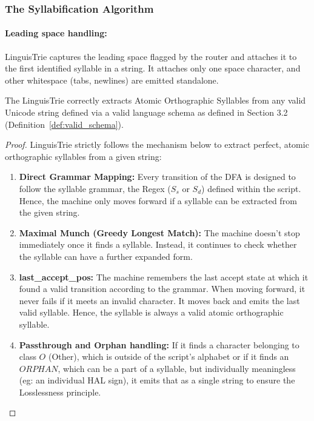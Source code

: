 \subsubsection{The Syllabification Algorithm}
\paragraph{Leading space handling:}
LinguisTrie captures the leading space flagged by the router and attaches it to the first identified syllable in a string. It attaches only one space character, and other whitespace (tabs, newlines) are emitted standalone.

\begin{proposition}
The LinguisTrie correctly extracts Atomic Orthographic Syllables from any valid Unicode string defined via a valid language schema as defined in Section 3.2 (Definition~\ref{def:valid_schema}).
\end{proposition}

\begin{proof}
LinguisTrie strictly follows the mechanism below to extract perfect, atomic orthographic syllables from a given string:
\begin{enumerate}
    \item \textbf{Direct Grammar Mapping:} Every transition of the DFA is designed to follow the syllable grammar, the Regex ($S_s$ or $S_d$) defined within the script. Hence, the machine only moves forward if a syllable can be extracted from the given string.
    \item \textbf{Maximal Munch (Greedy Longest Match):} The machine doesn't stop immediately once it finds a syllable. Instead, it continues to check whether the syllable can have a further expanded form.
    \item \textbf{{last\_accept\_pos:}} The machine remembers the last accept state at which it found a valid transition according to the grammar. When moving forward, it never fails if it meets an invalid character. It moves back and emits the last valid syllable. Hence, the syllable is always a valid atomic orthographic syllable.
    \item \textbf{Passthrough and Orphan handling:} If it finds a character belonging to class $O$ (Other), which is outside of the script's alphabet or if it finds an $ORPHAN$, which can be a part of a syllable, but individually meaningless (eg: an individual HAL sign), it emits that as a single string to ensure the Losslessness principle.
\end{enumerate}
\end{proof}

